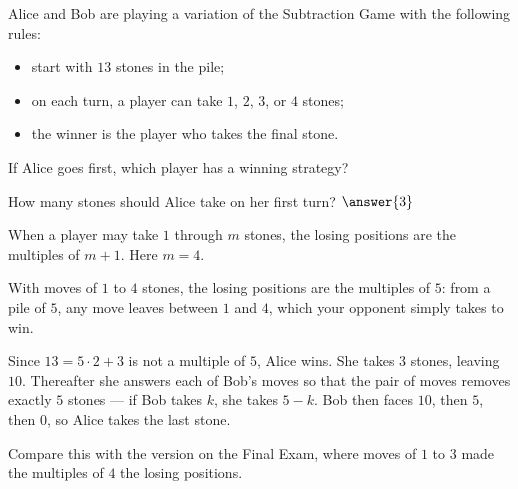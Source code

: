 \documentclass[12pt]{ximera}
\begin{document}
\begin{problem}
Alice and Bob are playing a variation of the Subtraction Game with the following
rules:
\begin{itemize}
\item start with $13$ stones in the pile;
\item on each turn, a player can take $1$, $2$, $3$, or $4$ stones;
\item the winner is the player who takes the final stone.
\end{itemize}

\begin{prompt}
If Alice goes first, which player has a winning strategy?

\begin{multipleChoice}
\end{multipleChoice}

How many stones should Alice take on her first turn? $\answer{3}$

\begin{hint}
When a player may take $1$ through $m$ stones, the losing positions are the multiples
of $m+1$. Here $m=4$.
\end{hint}

\begin{solution}
With moves of $1$ to $4$ stones, the losing positions are the multiples of $5$: from a
pile of $5$, any move leaves between $1$ and $4$, which your opponent simply takes to
win.

Since $13 = 5\cdot 2 + 3$ is not a multiple of $5$, Alice wins. She takes $3$ stones,
leaving $10$. Thereafter she answers each of Bob's moves so that the pair of moves
removes exactly $5$ stones --- if Bob takes $k$, she takes $5-k$. Bob then faces
$10$, then $5$, then $0$, so Alice takes the last stone.

Compare this with the version on the Final Exam, where moves of $1$ to $3$ made the
multiples of $4$ the losing positions.
\end{solution}
\end{prompt}
\end{problem}
\end{document}
